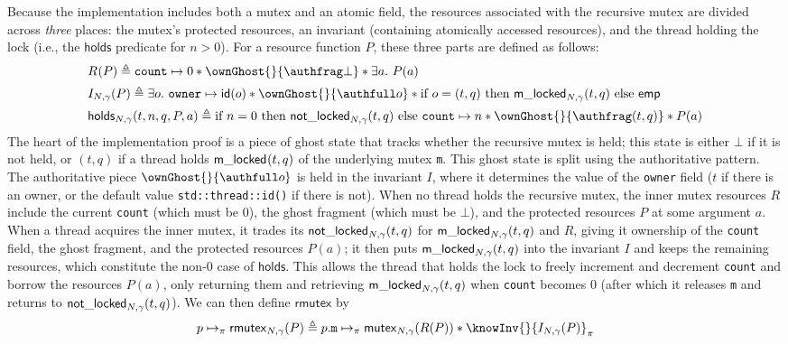 Because the implementation includes both a mutex and an atomic field, the resources associated with the recursive mutex are divided across \emph{three} places: the mutex's protected resources, an invariant (containing atomically accessed resources), and the thread holding the lock (i.e., the $\mathsf{holds}$ predicate for $n > 0$). For a resource function $P$, these three parts are defined as follows:
\[\begin{array}{l}%
R_{}(P) \triangleq \texttt{count} \mapsto 0 \ast \ownGhost{}{\authfrag \bot} \ast \exists a.\ P(a) \vspace{.5em}\\
I_{N, \gamma}(P) \triangleq \exists o.\ \texttt{owner} \mapsto \mathsf{id}(o) \ast \ownGhost{}{\authfull o} \ast \text{if } o = (t, q) \text{ then } \locked{N, \gamma}{t}{q} \text{ else } \mathsf{emp}\vspace{.5em}\\
\acquirable{N, \gamma}{t}{n}{q}{P}{a} \triangleq \text{if } n = 0 \text{ then } \notlocked{N, \gamma}{t}{q} \text{ else } \texttt{count} \mapsto n \ast \ownGhost{}{\authfrag (t, q)} \ast P(a)\end{array}\]
The heart of the implementation proof is a piece of ghost state that tracks whether the recursive mutex is held; this state is either $\bot$ if it is not held, or $(t, q)$ if a thread holds $\mathsf{m\_locked}_{}(t, q)$ of the underlying mutex \lstinline{m}. This ghost state is split using the authoritative pattern. The authoritative piece $\ownGhost{}{\authfull o}$ is held in the invariant $I$, where it determines the value of the \lstinline{owner} field ($t$ if there is an owner, or the default value \lstinline{std::thread::id()} if there is not). When no thread holds the recursive mutex, the inner mutex resources $R$ include the current \lstinline{count} (which must be 0), the ghost fragment (which must be $\bot$), and the protected resources $P$ at some argument $a$. When a thread acquires the inner mutex, it trades its $\mathsf{not\_locked}_{N, \gamma}(t, q)$ for $\mathsf{m\_locked}_{N, \gamma}(t, q)$ and $R$, giving it ownership of the \lstinline{count} field, the ghost fragment, and the protected resources $P(a)$; it then puts $\mathsf{m\_locked}_{N, \gamma}(t, q)$ into the invariant $I$ and keeps the remaining resources, which constitute the non-0 case of $\mathsf{holds}$. This allows the thread that holds the lock to freely increment and decrement \lstinline{count} and borrow the resources $P(a)$, only returning them and retrieving $\mathsf{m\_locked}_{N, \gamma}(t, q)$ when \lstinline{count} becomes 0 (after which it releases \lstinline{m} and returns to $\mathsf{not\_locked}_{N, \gamma}(t, q)$). We can then define $\mathsf{rmutex}$ by
\[p \mapsto_\pi \rmutex{N, \gamma}{P} \triangleq p.\texttt{m} \mapsto_\pi \mutex{N, \gamma}{R(P)} \ast \knowInv{}{I_{N, \gamma}(P)}_\pi\]

